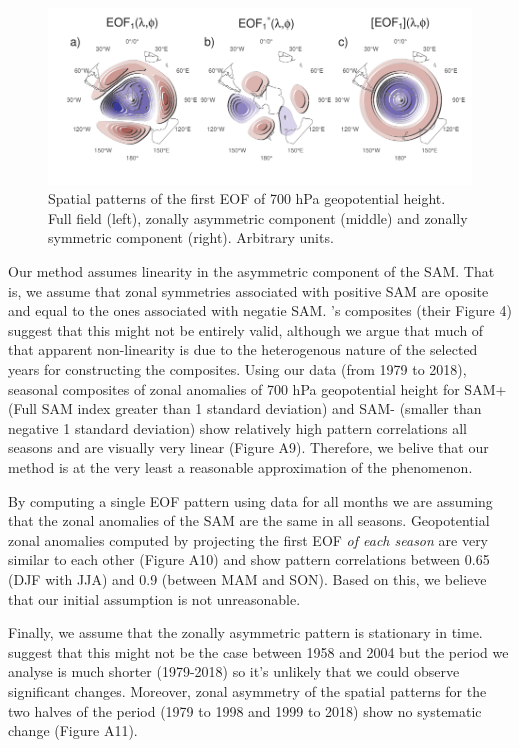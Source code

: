 \documentclass[twocol]{ametsocV5}
\begin{document}
\begin{figure}
\includegraphics{method-1} \caption[Spatial patterns of the first EOF of 700 hPa geopotential height]{Spatial patterns of the first EOF of 700 hPa geopotential height. Full field (left), zonally asymmetric component (middle) and zonally symmetric component (right). Arbitrary units.}\label{fig:method}
\end{figure}

Our method assumes linearity in the asymmetric component of the SAM.
That is, we assume that zonal symmetries associated with positive SAM
are oposite and equal to the ones associated with negatie SAM.
\citet{fogt2012}'s composites (their Figure 4) suggest that this might
not be entirely valid, although we argue that much of that apparent
non-linearity is due to the heterogenous nature of the selected years
for constructing the composites. Using our data (from 1979 to 2018),
seasonal composites of zonal anomalies of 700 hPa geopotential height
for SAM+ (Full SAM index greater than 1 standard deviation) and SAM-
(smaller than negative 1 standard deviation) show relatively high
pattern correlations all seasons and are visually very linear (Figure
A9). Therefore, we belive that our method is at the very least a
reasonable approximation of the phenomenon.

By computing a single EOF pattern using data for all months we are
assuming that the zonal anomalies of the SAM are the same in all
seasons. Geopotential zonal anomalies computed by projecting the first
EOF \emph{of each season} are very similar to each other (Figure A10)
and show pattern correlations between 0.65 (DJF with JJA) and 0.9
(between MAM and SON). Based on this, we believe that our initial
assumption is not unreasonable.

Finally, we assume that the zonally asymmetric pattern is stationary in
time. \citet{silvestri2009} suggest that this might not be the case
between 1958 and 2004 but the period we analyse is much shorter
(1979-2018) so it's unlikely that we could observe significant changes.
Moreover, zonal asymmetry of the spatial patterns for the two halves of
the period (1979 to 1998 and 1999 to 2018) show no systematic change
(Figure A11).
\end{document}
